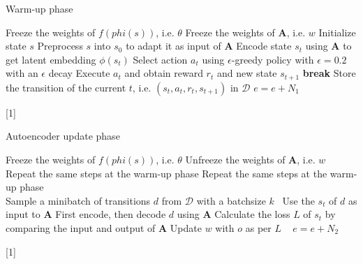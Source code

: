 \documentclass[a4paper,12pt,oneside]{article}
\numberwithin{equation}{section}
\begin{document}
    \clearpage
    \begin{algorithm}
    \caption{Warm-up phase}
        \begin{algorithmic}[1]
            \State Freeze the weights of \(f(phi(s))\), i.e. $\theta$
            \State Freeze the weights of $\mathbf{A}$, i.e. \(w\)
            \State Initialize state \(s\) 
            \State Preprocess \(s\) into \(s_0\) to adapt it as input of $\mathbf{A}$
                \State Encode state \(s_t\) using $\mathbf{A}$ to get latent embedding $\phi(s_t)$
                \State Select action $a_t$ using $\epsilon$-greedy policy with $\epsilon=0.2$ with an $\epsilon$ decay
                \State Execute $a_t$ and obtain reward $r_t$ and new state $s_{t+1}$
                    \State \textbf{break}
                \EndIf
                \State Store the transition of the current \(t\), i.e. $(s_t, a_t, r_t, s_{t+1})$ in $\mathcal{D}$
            \EndFor
        \EndFor
        \State $e=e+N_1$
        \end{algorithmic}[1]
    \end{algorithm}
    
    \clearpage
    \begin{algorithm}
    \caption{Autoencoder update phase}
        \begin{algorithmic}[1]
            \State Freeze the weights of \(f(phi(s))\), i.e. $\theta$
            \State Unfreeze the weights of $\mathbf{A}$, i.e. \(w\)
            \State Repeat the same steps at the warm-up phase
                \State Repeat the same steps at the warm-up phase
                \\
                \State Sample a minibatch of transitions \(d\) from $\mathcal{D}$ with a batchsize \(k\) \
                \State Use the \(s_t\) of \(d\) as input to $\mathbf{A}$
                \State First encode, then decode \(d\) using $\mathbf{A}$
                \State Calculate the loss \(L\) of \(s_t\) by comparing the input and output of $\mathbf{A}$
                \State Update \(w\) with \(o\) as per \(L\)
                \
            \EndFor
        \EndFor
        \State $e=e+N_2$
        \end{algorithmic}[1]
    \end{algorithm}
\end{document}
